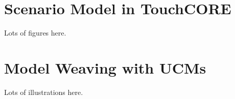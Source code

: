 \section{Scenario Model in TouchCORE}

Lots of figures here.

\section{Model Weaving with UCMs}

Lots of illustrations here.
